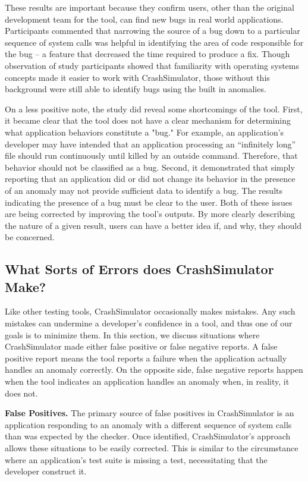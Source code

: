 These results are important
because they confirm
users, other than the original development team for the tool,
can find new bugs in real world applications.
Participants commented that narrowing the source of a bug
down to a particular sequence of system calls
was helpful in identifying the area of
code responsible for the bug -- a feature
that decreased the time required to produce a fix.
Though observation of study participants
showed that familiarity with operating systems concepts
made it easier to work with CrashSimulator,
those without this background were still able to identify bugs using the
built in anomalies.

On a less positive note,
the study did reveal
some shortcomings
of the tool.
First,
it became clear that the tool
does not have a clear mechanism
for determining
what application behaviors constitute a "bug."
For example, an application's developer
may have intended that an application processing an ``infinitely long'' file should run continuously
until killed by an outside command.
Therefore, that behavior should not be classified as a bug.
Second,
it demonstrated that
simply reporting that an application did or did not change its behavior
in the presence of an anomaly may not provide sufficient data to identify a bug. The results indicating the presence of a bug must be clear to the user.
Both of these issues are being corrected
by improving the tool's outputs.
By more clearly describing
the nature of a given result,
users can have a better idea
if,
and why,
they should be concerned.


\subsection{What Sorts of Errors does CrashSimulator Make?}
\label{sec-sorts-errors}

Like other testing tools, CrashSimulator occasionally makes mistakes.
Any such mistakes can
undermine a developer's confidence in a tool, and thus one of our goals is
to minimize them.   In this section, we discuss
situations where CrashSimulator made either false positive or false
negative reports.  A false positive report means the tool reports
a failure when the application actually handles an anomaly correctly.
On the opposite side, false negative reports happen when the tool indicates an application handles
an anomaly when, in reality, it does not.

\textbf{False Positives.}
The primary source of false positives in CrashSimulator is an application
responding to an anomaly with a different sequence of system calls
than was expected by the checker.
Once identified, CrashSimulator's approach allows these
situations to be easily corrected.
This is similar to the circumstance where an
application's test suite is missing a test, necessitating that the
developer construct it.

